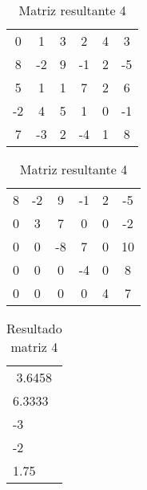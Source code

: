\documentclass[12pt]{article}
\begin{document}
\begin{table}[htb]
  \begin{minipage}[b]{.46\linewidth}

    \centering
    \begin{tabular}{|c c c c c|c|}
        0           &         1          &           3     &   2     &   4   &   3\\
        8          &         -2           &          9     &   -1     &   2   &   -5\\
        5           &         1           &          1     &   7     &   2   &   6\\
        -2          &         4           &           5     &   1    &     0   &   -1\\
        7          &         -3           &           2     &   -4    &     1   &   8\\
    \end{tabular}
    \caption{Matriz de entrada 4}
    \label{tab:esq}

  \end{minipage}\hfill
  \begin{minipage}[b]{.46\linewidth}

    \centering
    \begin{tabular}{|c c c c c|c|}
        8           &         -2          &           9     &   -1     &   2   &   -5\\
        0          &         3           &          7     &   0     &   0   &   -2\\
        0           &         0           &          -8     &   7     &   0   &   10\\
        0          &         0           &           0     &   -4    &     0   &   8\\
        0          &         0           &           0     &   0    &     4   &   7\\
    \end{tabular}
    \caption{Matriz resultante 4}
    \label{tab:dir}
  \end{minipage}
\end{table}


\begin{table}[!h]
\centering
\begin{tabular}{|l|}
\multicolumn{1}{|c|}{3.6458} \\
6.3333                         \\
-3                        \\
-2                        \\
1.75
\end{tabular}
\caption{Resultado matriz 4}
\end{table}
\end{document}
